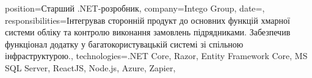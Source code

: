\companyexperience
{
    position={Старший .NET-розробник},
    company={Intego Group},
    date={},
    responsibilities={Інтегрував сторонній продукт до основних функцій хмарної системи обліку та контролю виконання замовлень підрядниками. Забезпечив функціонал додатку у багатокористувацькій системі зі спільною інфраструктурою.},
    technologies={.NET Core, Razor, Entity Framework Core, MS SQL Server, ReactJS, Node.js, Azure, Zapier},
}
